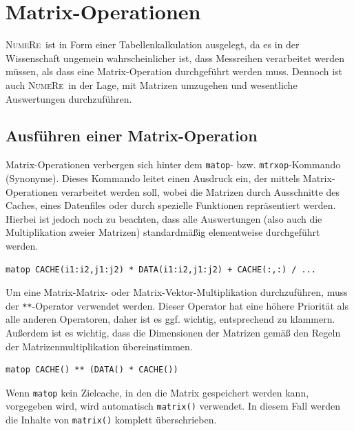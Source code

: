 \documentclass[DIV=14,headsepline,footsepline]{scrbook}
\newcommand{\NR}{\textsc{Nu\-me\-Re}}
\begin{document}
		\chapter{Matrix-Operationen}
			\NR\ ist in Form einer Tabellenkalkulation ausgelegt, da es in der Wissenschaft ungemein wahrscheinlicher ist, dass Messreihen verarbeitet werden müssen, als dass eine Matrix-Operation durchgeführt werden muss. Dennoch ist auch \NR\ in der Lage, mit Matrizen umzugehen und wesentliche Auswertungen durchzuführen.
			\section{Ausführen einer Matrix-Operation}
				Matrix-Operationen verbergen sich hinter dem \verb+matop+- bzw. \verb+mtrxop+-Kommando (Synonyme). Dieses Kommando leitet einen Ausdruck ein, der mittels Matrix-Operationen verarbeitet werden soll, wobei die Matrizen durch Ausschnitte des Caches, eines Datenfiles oder durch spezielle Funktionen repräsentiert werden. Hierbei ist jedoch noch zu beachten, dass alle Auswertungen (also auch die Multiplikation zweier Matrizen) standardmäßig elementweise durchgeführt werden.
				\begin{lstlisting}
matop CACHE(i1:i2,j1:j2) * DATA(i1:i2,j1:j2) + CACHE(:,:) / ...
				\end{lstlisting}
				
				Um eine Matrix-Matrix- oder Matrix-Vektor-Multiplikation durchzuführen, muss der \verb+**+-O\-pe\-ra\-tor verwendet werden. Dieser Operator hat eine höhere Priorität als alle anderen Operatoren, daher ist es ggf. wichtig, entsprechend zu klammern. Außerdem ist es wichtig, dass die Dimensionen der Matrizen gemäß den Regeln der Matrizenmultiplikation übereinstimmen.
				\begin{lstlisting}
matop CACHE() ** (DATA() * CACHE())
				\end{lstlisting}
				
				Wenn \verb+matop+ kein Zielcache, in den die Matrix gespeichert werden kann, vorgegeben wird, wird automatisch \verb+matrix()+ verwendet. In diesem Fall werden die Inhalte von \verb+matrix()+ komplett überschrieben.
				
\end{document}
